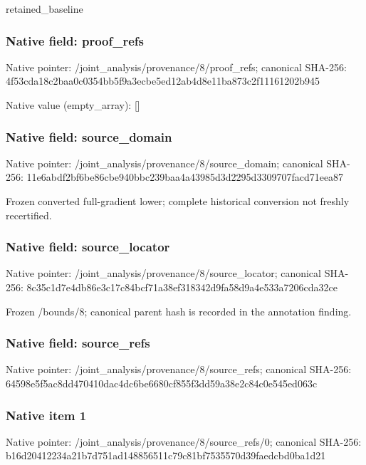 \documentclass[10pt,a4paper]{article}
\begin{document}
\begingroup\raggedright\sloppy retained\_\allowbreak{}baseline\par\endgroup

\subsubsection{Native field: proof\_\allowbreak{}refs}
Native pointer: /joint\_\allowbreak{}analysis/provenance/8/proof\_\allowbreak{}refs; canonical SHA-256: 4f53cda18c2baa0c0354bb5f9a3ecbe5ed12ab4d8e11ba873c2f11161202b945

Native value (empty\_\allowbreak{}array): []

\subsubsection{Native field: source\_\allowbreak{}domain}
Native pointer: /joint\_\allowbreak{}analysis/provenance/8/source\_\allowbreak{}domain; canonical SHA-256: 11e6abdf2bf6be86cbe940bbc239baa4a43985d3d2295d3309707facd71eea87

\begingroup\raggedright\sloppy Frozen converted full-gradient lower;\allowbreak{} complete historical conversion not freshly recertified.\par\endgroup

\subsubsection{Native field: source\_\allowbreak{}locator}
Native pointer: /joint\_\allowbreak{}analysis/provenance/8/source\_\allowbreak{}locator; canonical SHA-256: 8c35c1d7e4db86e3c17c84bcf71a38ef318342d9fa58d9a4e533a7206cda32ce

\begingroup\raggedright\sloppy Frozen /\allowbreak{}bounds/\allowbreak{}8;\allowbreak{} canonical parent hash is recorded in the annotation finding.\par\endgroup

\subsubsection{Native field: source\_\allowbreak{}refs}
Native pointer: /joint\_\allowbreak{}analysis/provenance/8/source\_\allowbreak{}refs; canonical SHA-256: 64598e5f5ac8dd470410dac4dc6be6680cf855f3dd59a38e2c84c0e545ed063c

\subsubsection{Native item 1}
Native pointer: /joint\_\allowbreak{}analysis/provenance/8/source\_\allowbreak{}refs/0; canonical SHA-256: b16d20412234a21b7d751ad148856511c79c81bf7535570d39faedcbd0ba1d21
\end{document}
